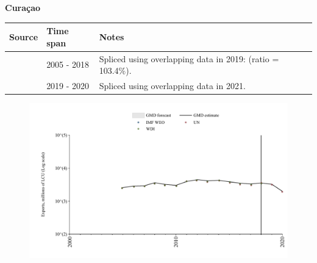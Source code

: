 \documentclass[12pt,a4paper,landscape]{article}
\begin{document}
\begin{adjustbox}{max totalsize={\paperwidth}{\paperheight},center}
\begin{minipage}[t][\textheight][t]{\textwidth}
\vspace*{0.5cm}
{}
\begin{center}
{\Large\bfseries Curaçao}
\end{center}
\vspace{0.5cm}
\begin{table}[H]
\centering
\small
\begin{tabular}{|l|l|l|}
\hline
\textbf{Source} & \textbf{Time span} & \textbf{Notes} \\
\hline
\rowcolor{white}\cite{WDI}& 2005 - 2018 &Spliced using overlapping data in 2019: (ratio = 103.4\%).\\
\rowcolor{lightgray}\cite{UN}& 2019 - 2020 &Spliced using overlapping data in 2021.\\
\hline
\end{tabular}
\end{table}
\begin{figure}[H]
\centering
\includegraphics[width=\textwidth,height=0.6\textheight,keepaspectratio]{graphs/CUW_exports.pdf}
\end{figure}
\end{minipage}
\end{adjustbox}
\end{document}
